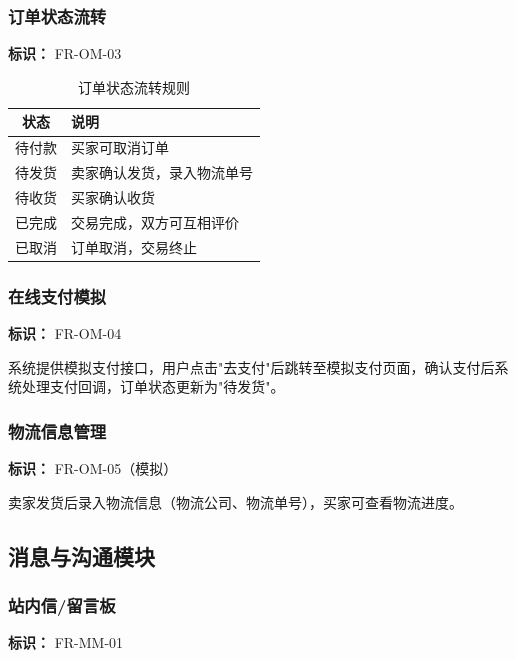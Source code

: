 \documentclass[12pt,a4paper,UTF8]{ctexart}
\begin{document}
\subsubsection{订单状态流转}

\textbf{标识：} FR-OM-03

\begin{table}[H]
    \centering
    \caption{订单状态流转规则}
    \begin{tabularx}{\textwidth}{|c|X|}
        \hline
        \textbf{状态} & \textbf{说明} \\
        \hline
        待付款 & 买家可取消订单 \\
        \hline
        待发货 & 卖家确认发货，录入物流单号 \\
        \hline
        待收货 & 买家确认收货 \\
        \hline
        已完成 & 交易完成，双方可互相评价 \\
        \hline
        已取消 & 订单取消，交易终止 \\
        \hline
    \end{tabularx}
\end{table}

\subsubsection{在线支付模拟}

\textbf{标识：} FR-OM-04

系统提供模拟支付接口，用户点击"去支付"后跳转至模拟支付页面，确认支付后系统处理支付回调，订单状态更新为"待发货"。

\subsubsection{物流信息管理}

\textbf{标识：} FR-OM-05（模拟）

卖家发货后录入物流信息（物流公司、物流单号），买家可查看物流进度。

\subsection{消息与沟通模块}

\subsubsection{站内信/留言板}

\textbf{标识：} FR-MM-01
\end{document}
